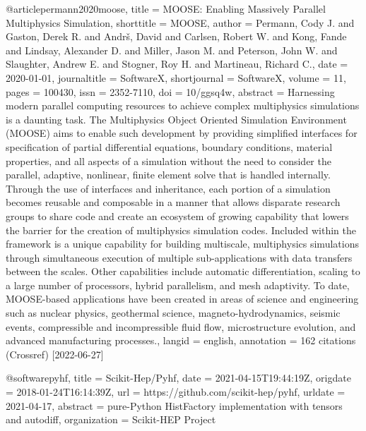 @article{permann2020moose,
  title = {{{MOOSE}}: {{Enabling}} Massively Parallel Multiphysics Simulation},
  shorttitle = {{{MOOSE}}},
  author = {Permann, Cody J. and Gaston, Derek R. and Andrš, David and Carlsen, Robert W. and Kong, Fande and Lindsay, Alexander D. and Miller, Jason M. and Peterson, John W. and Slaughter, Andrew E. and Stogner, Roy H. and Martineau, Richard C.},
  date = {2020-01-01},
  journaltitle = {SoftwareX},
  shortjournal = {SoftwareX},
  volume = {11},
  pages = {100430},
  issn = {2352-7110},
  doi = {10/ggsq4w},
  abstract = {Harnessing modern parallel computing resources to achieve complex multiphysics simulations is a daunting task. The Multiphysics Object Oriented Simulation Environment (MOOSE) aims to enable such development by providing simplified interfaces for specification of partial differential equations, boundary conditions, material properties, and all aspects of a simulation without the need to consider the parallel, adaptive, nonlinear, finite element solve that is handled internally. Through the use of interfaces and inheritance, each portion of a simulation becomes reusable and composable in a manner that allows disparate research groups to share code and create an ecosystem of growing capability that lowers the barrier for the creation of multiphysics simulation codes. Included within the framework is a unique capability for building multiscale, multiphysics simulations through simultaneous execution of multiple sub-applications with data transfers between the scales. Other capabilities include automatic differentiation, scaling to a large number of processors, hybrid parallelism, and mesh adaptivity. To date, MOOSE-based applications have been created in areas of science and engineering such as nuclear physics, geothermal science, magneto-hydrodynamics, seismic events, compressible and incompressible fluid flow, microstructure evolution, and advanced manufacturing processes.},
  langid = {english},
  annotation = {162 citations (Crossref) [2022-06-27]}
}

@software{pyhf,
  title = {Scikit-Hep/Pyhf},
  date = {2021-04-15T19:44:19Z},
  origdate = {2018-01-24T16:14:39Z},
  url = {https://github.com/scikit-hep/pyhf},
  urldate = {2021-04-17},
  abstract = {pure-Python HistFactory implementation with tensors and autodiff},
  organization = {Scikit-HEP Project}
}

